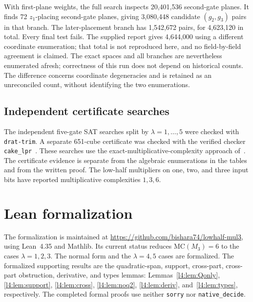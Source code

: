 \documentclass[11pt,a4paper]{article}
\theoremstyle{plain}
\theoremstyle{remark}
\begin{document}
With first-plane weights, the full search inspects 20,401,536 second-gate planes. It finds 72 $z_1$-placing second-gate planes, giving 3,080,448 candidate $(g_2,g_3)$ pairs in that branch. The later-placement branch has 1,542,672 pairs, for 4,623,120 in total. Every final test fails. The supplied report gives 4,644,000 using a different coordinate enumeration; that total is not reproduced here, and no field-by-field agreement is claimed. The exact spaces and all branches are nevertheless enumerated afresh; correctness of this run does not depend on historical counts. The difference concerns coordinate degeneracies and is retained as an unreconciled count, without identifying the two enumerations.


\subsection{Independent certificate searches}
The independent five-gate SAT searches split by $\lambda=1,\ldots,5$ were checked with \texttt{drat-trim}. A separate 651-cube certificate was checked with the verified checker \texttt{cake\_lpr}~\cite{cert}. These searches use the exact-multiplicative-complexity approach of~\cite{soeken}. The certificate evidence is separate from the algebraic enumerations in the tables and from the written proof. The low-half multipliers on one, two, and three input bits have reported multiplicative complexities $1,3,6$.

\section{Lean formalization}\label{sec:lean}
The formalization is maintained at \url{https://github.com/bishara74/lowhalf-mul3}, using Lean~4.35 and Mathlib. Its current status reduces $\mathrm{MC}(M_3)=6$ to the cases $\lambda=1,2,3$. The normal form and the $\lambda=4,5$ cases are formalized. The formalized supporting results are the quadratic-span, support, cross-part, cross-part obstruction, derivative, and types lemmas: Lemmas~\ref{l4:lem:Qonly}, \ref{l4:lem:support}, \ref{l4:lem:cross}, \ref{l4:lem:noq2}, \ref{l4:lem:deriv}, and~\ref{l4:lem:types}, respectively. The completed formal proofs use neither \texttt{sorry} nor \texttt{native\_decide}.
\end{document}
